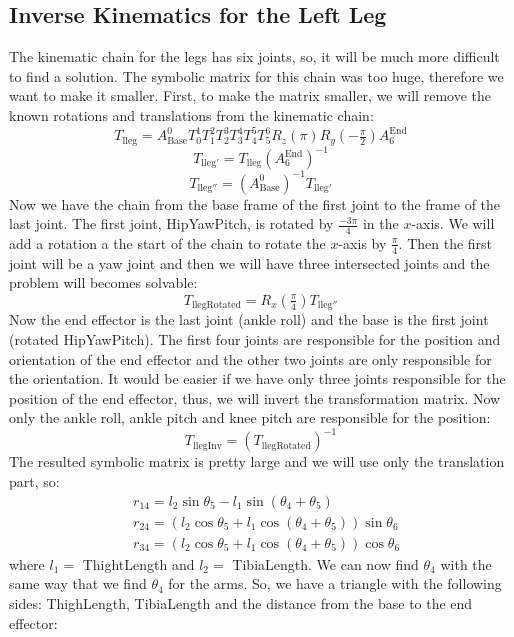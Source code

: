 \subsection{Inverse Kinematics for the Left Leg}
The kinematic chain for the legs has six joints, so, it will be much more difficult to find a solution. The symbolic matrix for this chain was too huge, therefore we want to make it smaller. First, to make the matrix smaller, we will remove the known rotations and translations from the kinematic chain:
\[
T_{\text{lleg}} = A^0_\text{Base}T^1_0T^2_1T^3_2T^4_3T^5_4T^6_5R_z(\pi)R_y(-\tfrac{\pi}{2})A^\text{End}_6
\]
\[
T_{\text{lleg}'} = T_\text{lleg}{\left(A^\text{End}_6\right)}^{-1}
\]
\[
T_{\text{lleg}''} = {\left(A^0_\text{Base}\right)}^{-1}T_{\text{lleg}'}
\]
Now we have the chain from the base frame of the first joint to the frame of the last joint. The first joint, HipYawPitch, is rotated by $ \frac{-3\pi}{4} $ in the $ x $-axis. We will add a rotation a the start of the chain to rotate the $x$-axis by $\frac{\pi}{4}$. Then the first joint will be a yaw joint and then we will have three intersected joints and the problem will becomes solvable:
\[
T_\text{llegRotated} = R_x(\tfrac{\pi}{4})T_{\text{lleg}''}
\]
Now the end effector is the last joint (ankle roll) and the base is the first joint (rotated HipYawPitch). The first four joints are responsible for the position and orientation of the end effector and the other two joints are only responsible for the orientation. It would be easier if we have only three joints responsible for the position of the end effector, thus, we will invert the transformation matrix. Now only the ankle roll, ankle pitch and knee pitch are responsible for the position:
\[
T_\text{llegInv} = {\left(T_\text{llegRotated}\right)}^{-1}
\]
The resulted symbolic matrix is pretty large and we will use only the translation part, so:
\begin{align*}
&r_{14} = l_2\sin\theta_5 - l_1\sin\left(\theta_4 + \theta_5\right)\\
&r_{24} = \left(l_2\cos\theta_5 + l_1 \cos\left(\theta_4 + \theta_5\right)\right)\sin\theta_6\\
&r_{34} = \left(l_2\cos\theta_5 + l_1 \cos\left(\theta_4 + \theta_5\right)\right)\cos\theta_6
\end{align*}
where $l_1 =$ ThightLength and $l_2 =$ TibiaLength.
We can now find $\theta_4$ with the same way that we find $\theta_4$ for the arms. So, we have a triangle with the following sides: ThighLength, TibiaLength and the distance from the base to the end effector:
